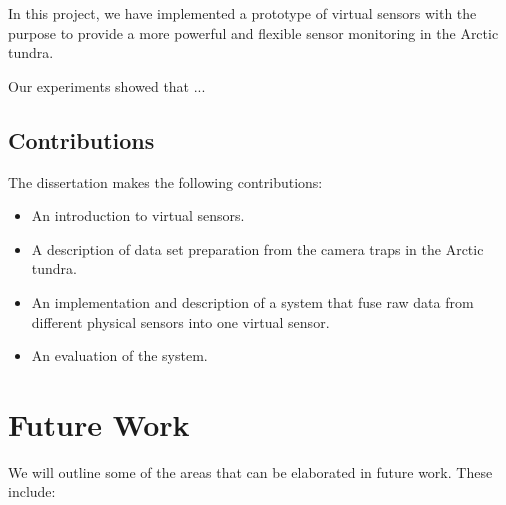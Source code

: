 \documentclass[USenglish]{uit-thesis}
\begin{document}
In this project, we have implemented a prototype of virtual sensors with the purpose to provide a more powerful and flexible sensor monitoring in the Arctic tundra. 

Our experiments showed that ...

\section{Contributions}
The dissertation makes the following contributions:

\begin{itemize}
\item An introduction to virtual sensors.
\item A description of data set preparation from the camera traps in the Arctic tundra.
\item An implementation and description of a system that fuse raw data from different physical sensors into one virtual sensor.
\item An evaluation of the system.
\end{itemize}



\chapter{Future Work}
We will outline some of the areas that can be elaborated in future work. These include:
\end{document}
